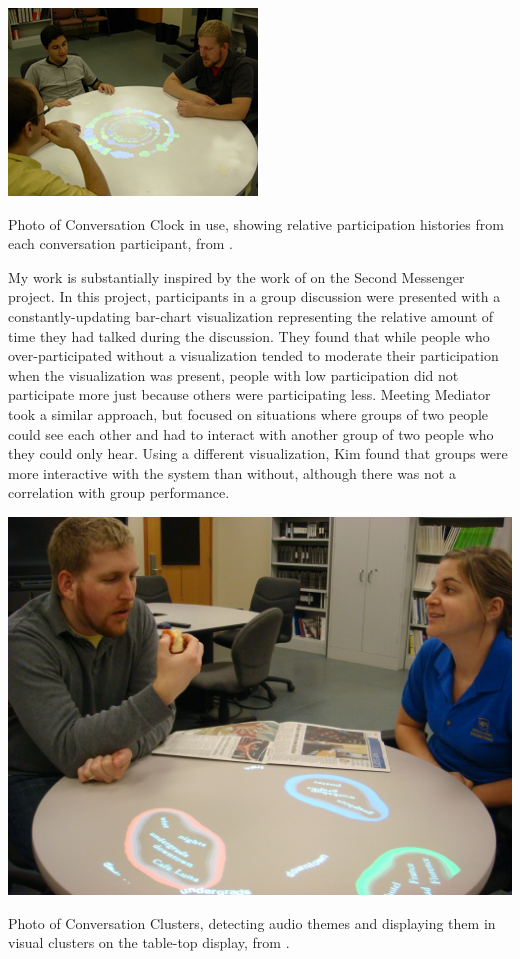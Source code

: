 \documentclass{tufte-handout}
\begin{document}
\begin{marginfigure}
	\includegraphics{figures/conversation_clock.png}
	\caption{Photo of Conversation Clock in use, showing relative participation histories from each conversation participant, from \citep{Bergstrom:2007je}.}
	\label{fig:conversation-clock}
\end{marginfigure}

My work is substantially inspired by the work of \citet{DiMicco:2007ie} on the Second Messenger project. In this project, participants in a group discussion were presented with a constantly-updating bar-chart visualization representing the relative amount of time they had talked during the discussion. They found that while people who over-participated without a visualization tended to moderate their participation when the visualization was present, people with low participation did not participate more just because others were participating less. Meeting Mediator \citep{Kim:2008ip} took a similar approach, but focused on situations where groups of two people could see each other and had to interact with another group of two people who they could only hear. Using a different visualization, Kim found that groups were more interactive with the system than without, although there was not a correlation with group performance. 

\begin{marginfigure}
	\includegraphics{figures/conversation_clusters.jpg}
	\caption{Photo of Conversation Clusters, detecting audio themes and displaying them in visual clusters on the table-top display, from  \citep{Bergstrom:2009fe}.}
	\label{fig:conversation-clusters}
\end{marginfigure}
\end{document}
